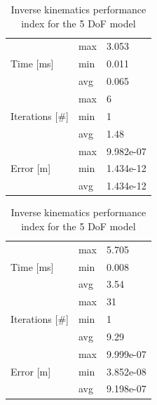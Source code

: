 \documentclass[a4paper]{article}
\begin{document}
\begin{table}
\begin{minipage}[b]{0.48\textwidth}
\begin{center}
\begin{tabular}{|l|l|l|}
\hline
\multirow{3}{1.5cm}{Time [ms]}  
&max &  3.053 \\
\cline{2-3} 
&min & 0.011\\
\cline{2-3} 
& avg & 0.065\\
\hline
\multirow{3}{1.5cm}{Iterations [\#]}   
&max & 6\\
\cline{2-3} 
& min & 1\\
\cline{2-3} 
& avg & 1.48\\
\hline
\multirow{3}{1.5cm}{Error [m]} 
&max & 9.982e-07\\
\cline{2-3} 
&min & 1.434e-12\\
\cline{2-3} 
&avg & 1.434e-12\\
\hline
\end{tabular}
\end{center}
\caption{Inverse kinematics performance index for the 3 DoF model}
\label{tab:KPI_3dof}
\end{minipage}
\begin{minipage}[b]{0.48\textwidth}

\begin{center}
\begin{tabular}{|l|l|l|}
\hline
\multirow{3}{1.5cm}{Time [ms]}  
&max &  5.705 \\
\cline{2-3} 
&min & 0.008\\
\cline{2-3} 
& avg & 3.54\\
\hline
\multirow{3}{1.5cm}{Iterations [\#]}   
&max & 31\\
\cline{2-3} 
& min & 1\\
\cline{2-3} 
& avg & 9.29\\
\hline
\multirow{3}{1.5cm}{Error [m]} 
&max & 9.999e-07\\
\cline{2-3} 
&min & 3.852e-08\\
\cline{2-3} 
&avg & 9.198e-07\\
\hline
\end{tabular}
\end{center}
\caption{Inverse kinematics performance index for the 5 DoF model}
\label{tab:KPI_6dof}
\end{minipage}
\end{table}
\end{document}
